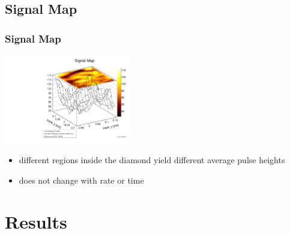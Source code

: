 \documentclass[9pt]{beamer}
\begin{document}
\subsection{Signal Map}
\begin{frame}
	\frametitle{Signal Map}
	\begin{center}
		\includegraphics[angle=270, width=5.5cm]{SignalMap}\\
	\end{center}
	\begin{itemize}
		\item different regions inside the diamond yield different average pulse heights
		\item does not change with rate or time
	\end{itemize}
\end{frame}
\section{Results}
\end{document}
